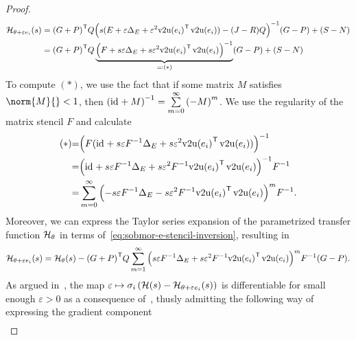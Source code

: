 \begin{proof}
\begin{equation}
\begin{aligned}
            \mathcal{H}_{\theta + \varepsilon e_i}(s) &= {(G + P)}^{\mkern1mu \mathsf{T}} Q {\left( s (E + \varepsilon \Delta_E + \varepsilon^2 {\mathop{}\!\mathrm{v}2\mathrm{u}(e_i)}^{\mkern1mu \mathsf{T}} \mathop{}\!\mathrm{v}2\mathrm{u}(e_i)) - (J - R) Q \right)}^{-1} (G - P) + (S - N) \\
             &= {(G + P)}^{\mkern1mu \mathsf{T}} Q \underbrace{{\left( F + s \varepsilon \Delta_E + s \varepsilon^2 {\mathop{}\!\mathrm{v}2\mathrm{u}(e_i)}^{\mkern1mu \mathsf{T}} \mathop{}\!\mathrm{v}2\mathrm{u}(e_i) \right)}^{-1}}_{\eqqcolon (*)} (G - P) + (S - N)
        \end{aligned}
    \end{equation}
    To compute $(*)$, we use the fact that if some matrix $M$ satisfies $\norm{M}{} < 1$, then ${(\text{id}_{} + M)}^{-1} = \sum\limits_{m = 0}^\infty {(-M)}^m$.
    We use the regularity of the matrix stencil $F$ and calculate
    \begin{equation}\label{eq:sobmor-e-stencil-inversion}
        \begin{alignedat}{3}
            &(*) &= &{\left( F (\text{id}_{} + s \varepsilon F^{-1} \Delta_E + s \varepsilon^2 {\mathop{}\!\mathrm{v}2\mathrm{u}(e_i)}^{\mkern1mu \mathsf{T}} \mathop{}\!\mathrm{v}2\mathrm{u}(e_i)) \right)}^{-1} \\
            & &= &{\left( \text{id}_{} + s \varepsilon F^{-1} \Delta_E + s \varepsilon^2 F^{-1} {\mathop{}\!\mathrm{v}2\mathrm{u}(e_i)}^{\mkern1mu \mathsf{T}} \mathop{}\!\mathrm{v}2\mathrm{u}(e_i) \right)}^{-1} F^{-1} \\
            & &= &\sum\limits_{m = 0}^\infty {\left( - s \varepsilon F^{-1} \Delta_E - s \varepsilon^2 F^{-1} {\mathop{}\!\mathrm{v}2\mathrm{u}(e_i)}^{\mkern1mu \mathsf{T}}\mathop{}\!\mathrm{v}2\mathrm{u}(e_i) \right)}^m F^{-1}.
        \end{alignedat}
    \end{equation}
    Moreover, we can express the Taylor series expansion of the parametrized transfer function $\mathcal{H}_\theta$ in terms of~\eqref{eq:sobmor-e-stencil-inversion}, resulting in
    \begin{equation}\label{eq:sobmor-e-taylor}
        \mathcal{H}_{\theta + \varepsilon e_i}(s) = \mathcal{H}_\theta(s) - {(G + P)}^{\mkern1mu \mathsf{T}} Q \sum\limits_{m = 1}^\infty {\left( s \varepsilon F^{-1} \Delta_E + s \varepsilon^2 F^{-1} {\mathop{}\!\mathrm{v}2\mathrm{u}(e_i)}^{\mkern1mu \mathsf{T}}\mathop{}\!\mathrm{v}2\mathrm{u}(e_i) \right)}^m F^{-1} (G - P).
    \end{equation}
    As argued in~\cite[Theorem~1]{Schwerdtner2022}, the map $\varepsilon \mapsto \sigma_i\left( \mathcal{H}(s) - \mathcal{H}_{\theta + \varepsilon e_i}(s) \right)$ is differentiable for small enough $\varepsilon > 0$ as a consequence of~\cite{Lancaster1964}, thusly admitting the following way of expressing the gradient component
    \begin{equation}\label{eq:sobmor-e-trace-form}
        \begin{aligned}

\end{aligned}
\end{equation}
\end{proof}
